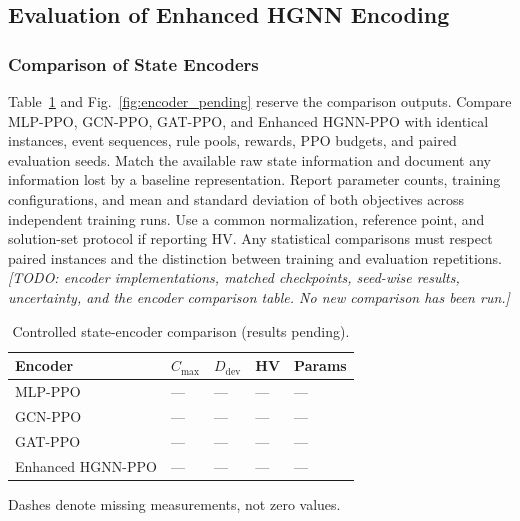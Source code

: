 \subsection{Evaluation of Enhanced HGNN Encoding}
\label{subsec:ablation}

\subsubsection{Comparison of State Encoders}
\label{subsubsec:encoder_comparison}
Table~\ref{tab:encoder_pending} and Fig.~\ref{fig:encoder_pending} reserve the comparison outputs. Compare MLP-PPO, GCN-PPO, GAT-PPO, and Enhanced HGNN-PPO with identical instances,
event sequences, rule pools, rewards, PPO budgets, and paired evaluation seeds. Match the available
raw state information and document any information lost by a baseline representation. Report parameter
counts, training configurations, and mean and standard deviation of both objectives across independent
training runs. Use a common normalization, reference point, and solution-set protocol if reporting HV.
Any statistical comparisons must respect paired instances and the distinction between training and
evaluation repetitions.
\textit{[TODO: encoder implementations, matched checkpoints, seed-wise results, uncertainty,
and the encoder comparison table. No new comparison has been run.]}


\begin{table}[t]
\centering
\caption{Controlled state-encoder comparison (results pending).}
\label{tab:encoder_pending}
\footnotesize
\setlength{\tabcolsep}{3pt}
\begin{tabular*}{\linewidth}{@{\extracolsep{\fill}}lllll@{}}
\toprule
Encoder & $C_{\max}$ & $D_{\mathrm{dev}}$ & HV & Params \\
\midrule
MLP-PPO & --- & --- & --- & --- \\
GCN-PPO & --- & --- & --- & --- \\
GAT-PPO & --- & --- & --- & --- \\
Enhanced HGNN-PPO & --- & --- & --- & --- \\
\bottomrule
\end{tabular*}
\par\smallskip
{\footnotesize Dashes denote missing measurements, not zero values.}
\end{table}

